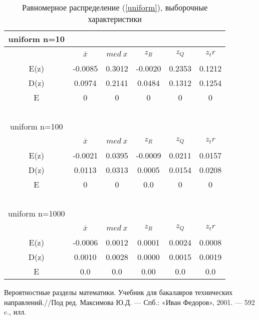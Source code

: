 \documentclass[12pt,a4paper]{article}
\begin{document}
			\begin{table}[h!]
				\label{tabular:uniform}
				\begin{center}
					\begin{tabular}{|c|c|c|c|c|c|} 
						
						\hline
						uniform n=10 & \ & \ & \ & \ & \ \\ \hline
						\ & $\overline{x}$ & $med \ x$ & $z_R$ & $z_Q$ & $z_tr$ \\ \hline
						E(z) & -0.0085 & 0.3012 & -0.0020 & 0.2353 & 0.1212 \\ \hline
						D(z) & 0.0974 & 0.2141 & 0.0484 &  0.1312  &  0.1254 \\ \hline
						E & 0 & 0 & 0 & 0 & 0\\\hline
						\ & \ & \ & \ & \ & \ \\ \hline
						
						uniform n=100 & \ & \ & \ & \ & \ \\ \hline
						\ & $\overline{x}$ & $med \ x$  & $z_R$  & $z_Q$  & $z_tr$ \\ \hline
						E(z) & -0.0021 & 0.0395 &  -0.0009 & 0.0211 & 0.0157 \\ \hline
						D(z) & 0.0113   & 0.0313 & 0.0005 &  0.0154 & 0.0208 \\ \hline
						E & 0 & 0 & 0.0 & 0 & 0\\\hline
						\ & \ & \ & \ & \ & \ \\ \hline
						
						uniform n=1000 & \ & \ & \ & \ & \ \\ \hline
						\ & $\overline{x}$ & $med \ x$  & $z_R$  & $z_Q$  & $z_tr$ \\ \hline
						E(z) & -0.0006 & 0.0012 & 0.0001 & 0.0024 & 0.0008 \\ \hline
						D(z) & 0.0010   & 0.0028 & 0.0000 &  0.0015  &  0.0019 \\ \hline
						E & 0.0 & 0.0 & 0.00 & 0.0 & 0.0\\\hline
						
					\end{tabular}
				\end{center}
				\caption{Равномерное распределение (\ref{uniform}), выборочные характеристики}
			\end{table}
		\clearpage
	\newpage
	
	\begin{thebibliography}{1}
		  Вероятностные разделы математики. Учебник для бакалавров технических направлений.//Под ред. Максимова Ю.Д. — Спб.: «Иван Федоров», 2001. — 592 c., илл.
	\end{thebibliography}
	
		
\end{document}
